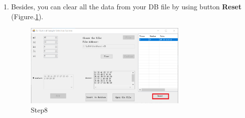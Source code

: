 \begin{enumerate}
\item Besides, you can clear all the data from your DB file by using button \textbf{Reset} (Figure.\ref{fig:st8}). 
\begin{figure}[!htbp]
	\centering
	\includegraphics[width=0.75\textwidth]{images/step8.png}
	\caption{Step8}
	\label{fig:st8}
\end{figure}
\end{enumerate}